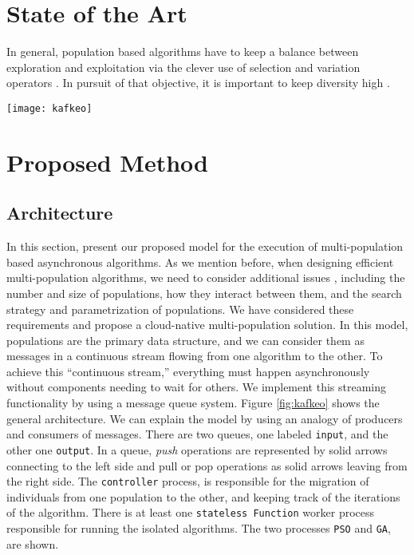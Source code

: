 \section{State of the Art}
\label{soa}

In general, population based algorithms have to keep a balance between
exploration and exploitation via the clever use of selection and
variation operators \cite{vcrepinvsek2013exploration}. In pursuit of
that objective, it is important to keep diversity high \cite{yuan2005importance}.


\begin{figure*}
\texttt{[image: kafkeo]}
\caption{A sample black and white graphic
that needs to span two columns of text.}
\label{fig:kafkeo}
\end{figure*}

\section{Proposed Method}
\label{method}

\subsection{Architecture}
\label{arch}

In this section, present our proposed model for the execution of
multi-population based asynchronous algorithms. As we mention before, when
designing efficient multi-population algorithms, we need to consider additional
issues \cite{Ma2019}, including the number and size of populations, how they
interact between them, and the search strategy and parametrization of
populations. We have considered these requirements and propose a cloud-native
multi-population solution. In this model, populations are the primary data
structure, and we can consider them as messages in a continuous stream flowing
from one algorithm to the other. To achieve this ``continuous stream,''
everything must happen asynchronously without components needing to wait for
others. We implement this streaming functionality by using a message queue
system. Figure \ref{fig:kafkeo} shows the general architecture. We can explain
the model by using an analogy of producers and consumers of messages. There are
two queues, one labeled \texttt{input}, and the other one \texttt{output}. In a
queue, {\em push} operations are represented by solid arrows connecting to the
left side and pull or pop operations as solid arrows leaving from the right
side. The \texttt{controller} process, is responsible for the migration of
individuals from one population to the other, and keeping track of the
iterations of the algorithm. There is at least one \texttt{stateless Function}
worker process responsible for running the isolated algorithms. The two
processes \texttt{PSO} and \texttt{GA}, are shown.

